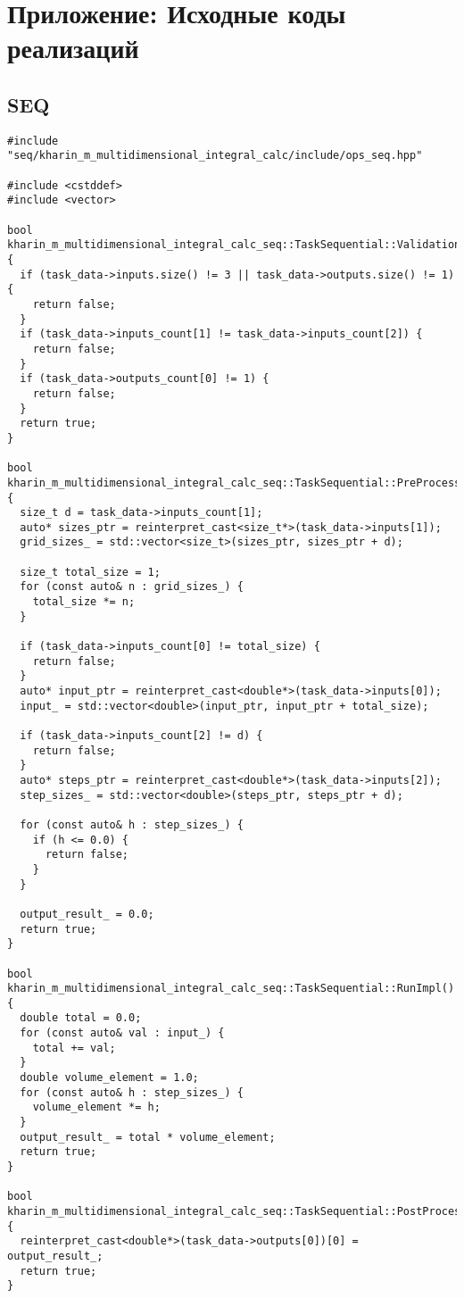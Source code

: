 \documentclass[12pt]{article}
\begin{document}
\newpage
\appendix
\section*{Приложение: Исходные коды реализаций}
\subsection*{SEQ}
\begin{lstlisting}
#include "seq/kharin_m_multidimensional_integral_calc/include/ops_seq.hpp"

#include <cstddef>
#include <vector>

bool kharin_m_multidimensional_integral_calc_seq::TaskSequential::ValidationImpl() {
  if (task_data->inputs.size() != 3 || task_data->outputs.size() != 1) {
    return false;
  }
  if (task_data->inputs_count[1] != task_data->inputs_count[2]) {
    return false;
  }
  if (task_data->outputs_count[0] != 1) {
    return false;
  }
  return true;
}

bool kharin_m_multidimensional_integral_calc_seq::TaskSequential::PreProcessingImpl() {
  size_t d = task_data->inputs_count[1];
  auto* sizes_ptr = reinterpret_cast<size_t*>(task_data->inputs[1]);
  grid_sizes_ = std::vector<size_t>(sizes_ptr, sizes_ptr + d);

  size_t total_size = 1;
  for (const auto& n : grid_sizes_) {
    total_size *= n;
  }

  if (task_data->inputs_count[0] != total_size) {
    return false;
  }
  auto* input_ptr = reinterpret_cast<double*>(task_data->inputs[0]);
  input_ = std::vector<double>(input_ptr, input_ptr + total_size);

  if (task_data->inputs_count[2] != d) {
    return false;
  }
  auto* steps_ptr = reinterpret_cast<double*>(task_data->inputs[2]);
  step_sizes_ = std::vector<double>(steps_ptr, steps_ptr + d);

  for (const auto& h : step_sizes_) {
    if (h <= 0.0) {
      return false;
    }
  }

  output_result_ = 0.0;
  return true;
}

bool kharin_m_multidimensional_integral_calc_seq::TaskSequential::RunImpl() {
  double total = 0.0;
  for (const auto& val : input_) {
    total += val;
  }
  double volume_element = 1.0;
  for (const auto& h : step_sizes_) {
    volume_element *= h;
  }
  output_result_ = total * volume_element;
  return true;
}

bool kharin_m_multidimensional_integral_calc_seq::TaskSequential::PostProcessingImpl() {
  reinterpret_cast<double*>(task_data->outputs[0])[0] = output_result_;
  return true;
}
\end{lstlisting}
\end{document}
